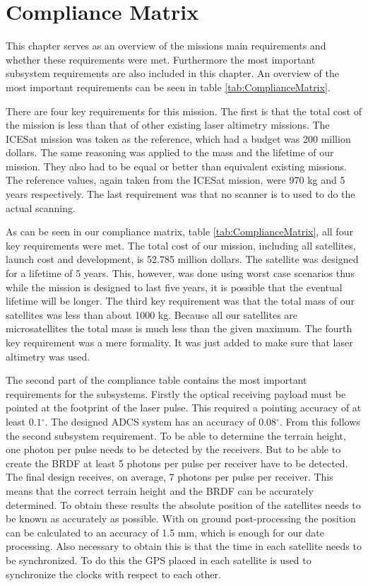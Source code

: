 \chapter{Compliance Matrix}
\label{chap:CM}
This chapter serves as an overview of the missions main requirements and whether these requirements were met. Furthermore the most important subsystem requirements are also included in this chapter. An overview of the most important requirements can be seen in table \ref{tab:ComplianceMatrix}. 

There are four key requirements for this mission. The first is that the total cost of the mission is less than that of other existing laser altimetry missions. The ICESat mission was taken as the reference, which had a budget was 200 million dollars. The same reasoning was applied to the mass and the lifetime of our mission. They also had to be equal or better than equivalent existing missions. The reference values, again taken from the ICESat mission, were 970 kg and 5 years respectively. The last requirement was that no scanner is to used to do the actual scanning.

As can be seen in our compliance matrix, table \ref{tab:ComplianceMatrix}, all four key requirements were met. The total cost of our mission, including all satellites, launch cost and development, is 52.785 million dollars. The satellite was designed for a lifetime of 5 years. This, however, was done using worst case scenarios thus while the mission is designed to last five years, it is possible that the eventual lifetime will be longer. The third key requirement was that the total mass of our satellites was less than about 1000 kg. Because all our satellites are microsatellites the total mass is much less than the given maximum. The fourth key requirement was a mere formality. It was just added to make sure that laser altimetry was used. 

The second part of the compliance table contains the most important requirements for the subsystems. Firstly the optical receiving payload must be pointed at the footprint of the laser pulse. This required a pointing accuracy of at least $0.1{}^{\circ}$. The designed ADCS system has an accuracy of $0.08{}^{\circ}$.
From this follows the second subsystem requirement. To be able to determine the terrain height, one photon per pulse needs to be detected by the receivers. But to be able to create the BRDF at least 5 photons per pulse per receiver have to be detected. The final design receives, on average, 7 photons per pulse per receiver. This means that the correct terrain height and the BRDF can be accurately determined.
To obtain these results the absolute position of the satellites needs to be known as accurately as possible. With on ground post-processing the position can be calculated to an accuracy of 1.5 mm, which is enough for our date processing. Also necessary to obtain this is that the time in each satellite needs to be synchronized. To do this the GPS placed in each satellite is used to synchronize the clocks with respect to each other.

